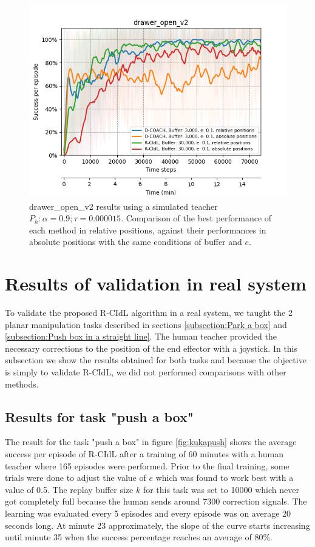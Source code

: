 \begin{figure}[H]
    \centering
    \includegraphics[width=.6\textwidth]{figures/drawer_best_v2.png}
    \caption{drawer\_open\_v2 results using a simulated teacher $P_h: \alpha = 0.9; \tau =  0.000015$. Comparison of the best performance of each method in relative positions, against their performances in absolute positions with the same conditions of buffer and $e$.}
    \label{fig:results_drawer_open_best}
\end{figure}


\section{Results of validation in real system}
\label{section:results_kuka}

To validate the proposed R-CIdL algorithm in a real system, we taught the 2 planar manipulation tasks described in sections \ref{subsection:Park a box} and \ref{subsection:Push box in a straight line}. The human teacher provided the necessary corrections to the position of the end effector with a joystick. In this subsection we show the results obtained for both tasks and because the objective is simply to validate R-CIdL, we did not performed comparisons with other methods. 


\subsection{Results for task "push a box"}
\label{subsection:results_kuka_push}
The result for the task "push a box" in figure \ref{fig:kukapush} shows the average success per episode of R-CIdL after a training of 60 minutes with a human teacher where 165 episodes were performed. Prior to the final training, some trials were done to adjust the value of $e$ which was found to work best with a value of 0.5. The replay buffer size $k$ for this task was set to 10000 which never got completely full because the human sends around 7300 correction signals.
The learning was evaluated every 5 episodes and every episode was on average 20 seconds long. At minute 23 approximately, the slope of the curve starts increasing until minute 35 when the success percentage reaches an average of 80\%.








